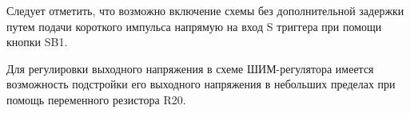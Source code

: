 Следует отметить, что возможно включение схемы без дополнительной задержки путем подачи короткого импульса напрямую на вход S триггера при помощи кнопки SB1.

Для регулировки выходного напряжения в схеме ШИМ-регулятора имеется возможность подстройки его выходного напряжения в небольших пределах при помощь переменного резистора R20.
